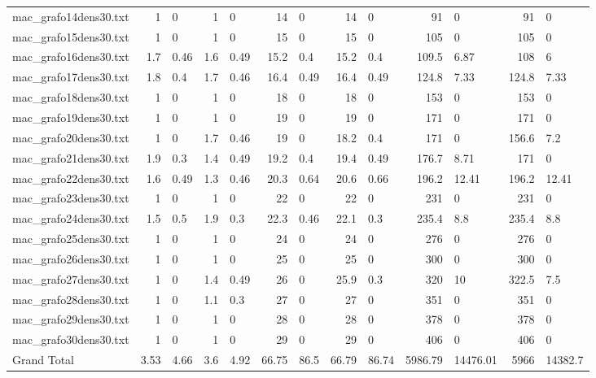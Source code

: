 \begin{tabular}{l r@{$\,\pm\,$}l r@{$\,\pm\,$}l r@{$\,\pm\,$}l r@{$\,\pm\,$}l r@{$\,\pm\,$}l r@{$\,\pm\,$}l}
mac\_grafo14dens30.txt & 1 & 0 & 1 & 0 & 14 & 0 & 14 & 0 & 91 & 0 & 91 & 0 \\
mac\_grafo15dens30.txt & 1 & 0 & 1 & 0 & 15 & 0 & 15 & 0 & 105 & 0 & 105 & 0 \\
mac\_grafo16dens30.txt & 1.7 & 0.46 & 1.6 & 0.49 & 15.2 & 0.4 & 15.2 & 0.4 & 109.5 & 6.87 & 108 & 6 \\
mac\_grafo17dens30.txt & 1.8 & 0.4 & 1.7 & 0.46 & 16.4 & 0.49 & 16.4 & 0.49 & 124.8 & 7.33 & 124.8 & 7.33 \\
mac\_grafo18dens30.txt & 1 & 0 & 1 & 0 & 18 & 0 & 18 & 0 & 153 & 0 & 153 & 0 \\
mac\_grafo19dens30.txt & 1 & 0 & 1 & 0 & 19 & 0 & 19 & 0 & 171 & 0 & 171 & 0 \\
mac\_grafo20dens30.txt & 1 & 0 & 1.7 & 0.46 & 19 & 0 & 18.2 & 0.4 & 171 & 0 & 156.6 & 7.2 \\
mac\_grafo21dens30.txt & 1.9 & 0.3 & 1.4 & 0.49 & 19.2 & 0.4 & 19.4 & 0.49 & 176.7 & 8.71 & 171 & 0 \\
mac\_grafo22dens30.txt & 1.6 & 0.49 & 1.3 & 0.46 & 20.3 & 0.64 & 20.6 & 0.66 & 196.2 & 12.41 & 196.2 & 12.41 \\
mac\_grafo23dens30.txt & 1 & 0 & 1 & 0 & 22 & 0 & 22 & 0 & 231 & 0 & 231 & 0 \\
mac\_grafo24dens30.txt & 1.5 & 0.5 & 1.9 & 0.3 & 22.3 & 0.46 & 22.1 & 0.3 & 235.4 & 8.8 & 235.4 & 8.8 \\
mac\_grafo25dens30.txt & 1 & 0 & 1 & 0 & 24 & 0 & 24 & 0 & 276 & 0 & 276 & 0 \\
mac\_grafo26dens30.txt & 1 & 0 & 1 & 0 & 25 & 0 & 25 & 0 & 300 & 0 & 300 & 0 \\
mac\_grafo27dens30.txt & 1 & 0 & 1.4 & 0.49 & 26 & 0 & 25.9 & 0.3 & 320 & 10 & 322.5 & 7.5 \\
mac\_grafo28dens30.txt & 1 & 0 & 1.1 & 0.3 & 27 & 0 & 27 & 0 & 351 & 0 & 351 & 0 \\
mac\_grafo29dens30.txt & 1 & 0 & 1 & 0 & 28 & 0 & 28 & 0 & 378 & 0 & 378 & 0 \\
mac\_grafo30dens30.txt & 1 & 0 & 1 & 0 & 29 & 0 & 29 & 0 & 406 & 0 & 406 & 0 \\
Grand Total & 3.53 & 4.66 & 3.6 & 4.92 & 66.75 & 86.5 & 66.79 & 86.74 & 5986.79 & 14476.01 & 5966 & 14382.7 \\
\hline
\end{tabular}